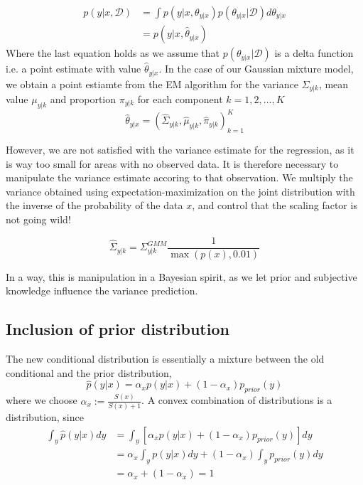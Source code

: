 


\begin{align*}
    p(y|x, \mathcal{D}) &= \int p(y|x,\theta_{y|x})p(\theta_{y|x}|\mathcal{D}) d\theta_{y|x}  \\
    &=  p(y|x,\hat \theta_{y|x})
\end{align*}
Where the last equation holds as we assume that $p(\theta_{y|x}|\mathcal{D})$ is a delta function
i.e. a point estimate with value $\hat \theta_{y|x}$. In the case of our Gaussian mixture model, 
we obtain a point estiamte from the EM algorithm for the variance $\Sigma_{y|k}$, mean value $\mu_{y|k}$ and proportion $\pi_{y|k}$
for each component $k = 1,2, \dots, K$
$$\hat \theta_{y|x} = (\hat\Sigma_{y|k}, \hat\mu_{y|k}, \hat\pi_{y|k})_{k=1}^K$$

However, we are not satisfied with the variance estimate for the regression, as it is way too small for areas with
no observed data. It is therefore necessary to manipulate the variance estimate accoring to that observation. 
We multiply the variance obtained using expectation-maximization on the joint distribution with the 
inverse of the probability of the data $x$, and control that the scaling factor is not going wild!

$$\hat\Sigma_{y|k} =\Sigma_{y|k}^{GMM} \frac{1}{\max(p(x), 0.01)}$$

In a way, this is manipulation in a Bayesian spirit, as we let prior and subjective knowledge influence the
variance prediction. 
\subsection{Inclusion of prior distribution}
The new conditional distribution is essentially a mixture between the old conditional and the prior distribution, 
$$\hat p(y|x) = \alpha_x p(y|x) + (1-\alpha_x)p_{prior}(y)$$
where we choose $\alpha_x := \frac{S(x)}{S(x)+1}$. A convex combination of distributions is a distribution, 
since 
\begin{align*}
    \int_y \hat p(y|x) dy &= \int_y \left[ \alpha_x p(y|x) + (1-\alpha_x)p_{prior}(y) \right] dy\\
     &= \alpha_x \int_y p(y|x)dy +(1-\alpha_x) \int_y p_{prior}(y)dy \\
     &= \alpha_x + (1-\alpha_x) = 1
\end{align*}
    
